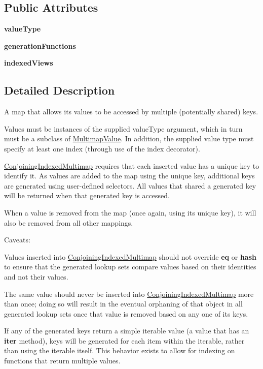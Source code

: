 \subsection*{Public Attributes}
\begin{DoxyCompactItemize}
\item 
{\bfseries value\+Type}
\item 
{\bfseries generation\+Functions}
\item 
{\bfseries indexed\+Views}
\end{DoxyCompactItemize}


\subsection{Detailed Description}
A map that allows its values to be accessed by multiple (potentially shared) keys. 

Values must be instances of the supplied value\+Type argument, which in turn must be a subclass of \hyperlink{classChronos_1_1Map_1_1MultimapValue}{Multimap\+Value}. In addition, the supplied value type must specify at least one index (through use of the index decorator).

\hyperlink{classChronos_1_1Map_1_1ConjoiningIndexedMultimap}{Conjoining\+Indexed\+Multimap} requires that each inserted value has a unique key to identify it. As values are added to the map using the unique key, additional keys are generated using user-\/defined selectors. All values that shared a generated key will be returned when that generated key is accessed.

When a value is removed from the map (once again, using its unique key), it will also be removed from all other mappings.

Caveats\+:

Values inserted into \hyperlink{classChronos_1_1Map_1_1ConjoiningIndexedMultimap}{Conjoining\+Indexed\+Multimap} should not override {\bfseries eq} or {\bfseries hash} to ensure that the generated lookup sets compare values based on their identities and not their values.

The same value should never be inserted into \hyperlink{classChronos_1_1Map_1_1ConjoiningIndexedMultimap}{Conjoining\+Indexed\+Multimap} more than once; doing so will result in the eventual orphaning of that object in all generated lookup sets once that value is removed based on any one of its keys.

If any of the generated keys return a simple iterable value (a value that has an {\bfseries iter} method), keys will be generated for each item within the iterable, rather than using the iterable itself. This behavior exists to allow for indexing on functions that return multiple values.

